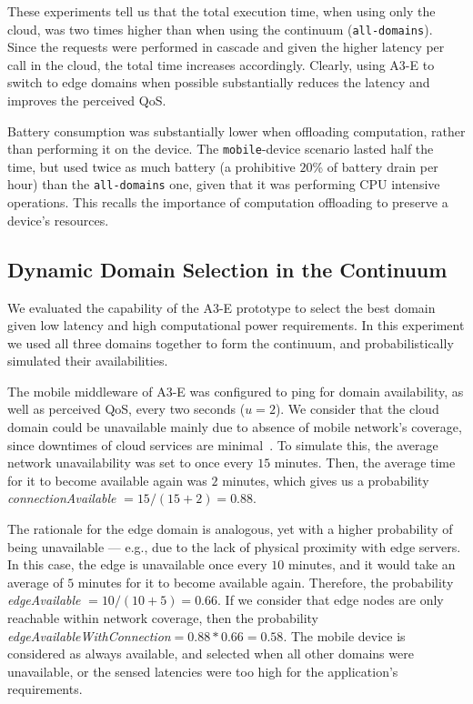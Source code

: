 These experiments tell us that the total execution time, when using only the cloud, was two times higher than when using the continuum (\texttt{all-domains}). Since the requests were performed in cascade and given the higher latency per call in the cloud, the total time increases accordingly. Clearly, using A3-E to switch to edge domains when possible substantially reduces the latency and improves the perceived QoS.

Battery consumption was substantially lower when offloading computation, rather than performing it on the device. The \texttt{mobile}-device scenario lasted half the time, but used twice as much battery (a prohibitive $20$\% of battery drain per hour) than the \texttt{all-domains} one, given that it was performing CPU intensive operations. This recalls the importance of computation offloading to preserve a device's resources.

\subsection{Dynamic Domain Selection in the Continuum}
\label{sub:domain-selection}

We evaluated the capability of the A3-E prototype to select the best domain given low latency and high computational power requirements. In this experiment we used all three domains together to form the continuum, and probabilistically simulated their availabilities. 

The mobile middleware of A3-E was configured to ping for domain availability, as well as perceived QoS, every two seconds ($u = 2$). We consider that the cloud domain could be unavailable mainly due to absence of mobile network's coverage, since downtimes of cloud services are minimal~\cite{garcia2017bandwidth}. To simulate this, the average network unavailability was set to once every $15$ minutes. Then, the average time for it to become available again was $2$ minutes, which gives us a probability \textit{connectionAvailable} $=15/(15+2)=0.88$.


The rationale for the edge domain is analogous, yet with a higher probability of  being unavailable --- e.g., due to the lack of physical proximity with edge servers. In this case, the edge is unavailable once every $10$ minutes, and it would take an average of $5$ minutes for it to become available again. Therefore, the probability \textit{edgeAvailable} $=10/(10+5)=0.66$. If we consider that edge nodes are only reachable within network coverage, then the probability \textit{edgeAvailableWithConnection}$=0.88*0.66=0.58$. The mobile device is considered as always available, and selected when all other domains were unavailable, or the sensed latencies were too high for the application's requirements. 

